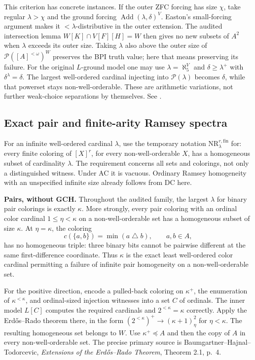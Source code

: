 This criterion has concrete instances. If the outer ZFC forcing has
size $\chi$, take regular $\lambda>\chi$ and the ground forcing
$\operatorname{Add}(\lambda,\delta)^V$. Easton's small-forcing argument
makes it $<\lambda$-distributive in the outer extension. The audited
intersection lemma $W[K]\cap V[F][H]=W$ then gives no new subsets of
$A^2$ when $\lambda$ exceeds its outer size. Taking $\lambda$ also above
the outer size of $\mathcal P([A]^{<\omega})^W$ preserves the BPI truth
value; here that means preserving its failure. For the original
$L$-ground model one may use $\lambda=\aleph_5^V$ and
$\delta\geq\lambda^+$ with $\delta^\lambda=\delta$. The largest
well-ordered cardinal injecting into $\mathcal P(\lambda)$ becomes
$\delta$, while that powerset stays non-well-orderable. These are
arithmetic variations, not further weak-choice separations by themselves.
See .

\subsection{Exact pair and finite-arity Ramsey spectra}

For an infinite well-ordered cardinal $\lambda$, use the temporary
notation $\mathrm{NR}^{r,\mathrm{fin}}_\lambda$ for: every finite
coloring of $[X]^r$, for every non-well-orderable $X$, has a homogeneous
subset of cardinality $\lambda$. The requirement concerns all sets and
colorings, not only a distinguished witness. Under AC it is vacuous.
Ordinary Ramsey homogeneity with an unspecified infinite size already
follows from DC here.

\textbf{Pairs, without GCH.}
Throughout the audited family, the largest $\lambda$ for binary pair
colorings is exactly $\kappa$. More strongly, every pair coloring with
an ordinal color cardinal $1\leq\eta<\kappa$ on a non-well-orderable
set has a homogeneous subset of size $\kappa$. At $\eta=\kappa$,
the coloring
\[
 c(\{a,b\})=\min(a\mathbin{\triangle}b),\qquad a,b\in A,
\]
has no homogeneous triple: three binary bits cannot be pairwise
different at the same first-difference coordinate. Thus $\kappa$ is
the exact least well-ordered color cardinal permitting a failure of
infinite pair homogeneity on a non-well-orderable set.

For the positive direction, encode a pulled-back coloring on
$\kappa^+$, the enumeration of $\kappa^{<\kappa}$, and ordinal-sized
injection witnesses into a set $C$ of ordinals. The inner model $L[C]$
computes the required cardinals and $2^{<\kappa}=\kappa$ correctly.
Apply the Erd\H{o}s--Rado theorem there, in the form
$(2^{<\kappa})^+\to(\kappa+1)^2_\eta$ for $\eta<\kappa$.
The resulting homogeneous set belongs to $W$. Use
$\kappa^+\preccurlyeq A$ and then the copy of $A$ in every
non-well-orderable set. The precise primary source is
Baumgartner--Hajnal--Todorcevic, \emph{Extensions of the Erd\H{o}s--Rado
Theorem}, Theorem 2.1, p.~4.

